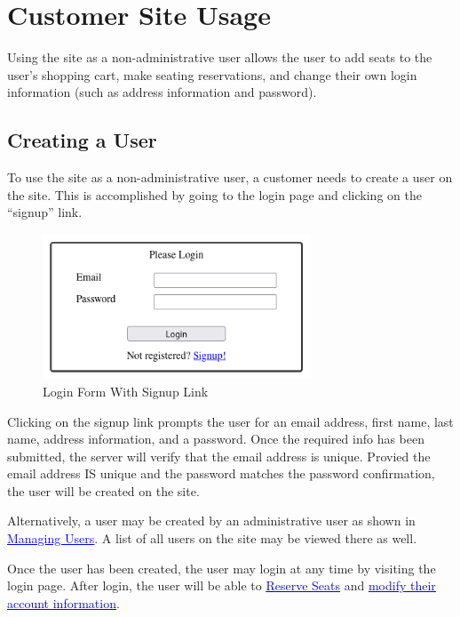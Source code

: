 \chapter{Customer Site Usage}

Using the site as a non-administrative user allows the user to add seats to the user's shopping cart, make seating reservations, and change their own login information (such as address information and password).

\section{Creating a User}

To use the site as a non-administrative user, a customer needs to create a user on the site. This is accomplished by going to the login page and clicking on the ``signup'' link.

\begin{figure}[ht]
    \centering
    \includegraphics[width=8cm]{images/chapter3/login form}
    \caption{Login Form With Signup Link}
    \label{ref:login_form}
\end{figure}

Clicking on the signup link prompts the user for an email address, first name, last name, address information, and a password. Once the required info has been submitted, the server will verify that the email address is unique. Provied the email address IS unique and the password matches the password confirmation, the user will be created on the site.

Alternatively, a user may be created by an administrative user as shown in \hyperref[sec:managing_users]{\textcolor{blue}{\underline{Managing Users}}}. A list of all users on the site may be viewed there as well.

Once the user has been created, the user may login at any time by visiting the login page. After login, the user will be able to \hyperref[sec:reserving_seats]{\textcolor{blue}{\underline{Reserve Seats}}} and \hyperref[sec:modifying_account_information]{\textcolor{blue}{\underline{modify their account information}}}.

